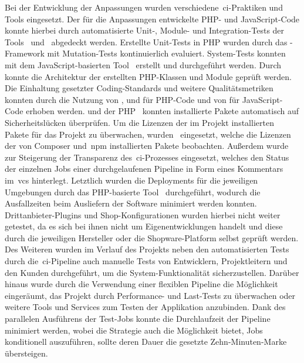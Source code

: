 Bei der Entwicklung der Anpassungen wurden verschiedene\ \acrshort{ci}-Praktiken und Tools eingesetzt.
Der für die Anpassungen entwickelte PHP- und JavaScript-Code konnte hierbei durch automatisierte Unit-, Module- und
Integration-Tests der Tools\  und\  abgedeckt werden.
Erstellte Unit-Tests in PHP wurden durch das -Framework mit Mutation-Tests kontinuierlich
evaluiert.
System-Tests konnten mit dem JavaScript-basierten Tool\  erstellt und durchgeführt werden.
Durch\  konnte die Architektur der erstellten PHP-Klassen und Module geprüft werden.
Die Einhaltung gesetzter Coding-Standards und weitere Qualitätsmetriken konnten durch die Nutzung von
,  und  für PHP-Code und von  für
JavaScript-Code erhoben werden.
 und der PHP\  konnten installierte Pakete automatisch auf
Sicherheitslücken überprüfen.
Um die Lizenzen der im Projekt installierten Pakete für das Projekt zu überwachen, wurden\ 
eingesetzt, welche die Lizenzen der von Composer und\ \acrshort{npm} installierten Pakete beobachten.
Außerdem wurde\  zur Steigerung der Transparenz des\ \acrshort{ci}-Prozesses eingesetzt, welches
den Status der einzelnen Jobs einer durchgelaufenen Pipeline in Form eines Kommentars im\ \acrshort{vcs} hinterlegt.
Letztlich wurden die Deployments für die jeweiligen Umgebungen durch das PHP-basierte Tool\ 
durchgeführt, wodurch die Ausfallzeiten beim Ausliefern der Software minimiert werden konnten.
\\
Drittanbieter-Plugins und Shop-Konfigurationen wurden hierbei nicht weiter getestet, da es sich bei ihnen nicht um
Eigenentwicklungen handelt und diese durch die jeweiligen Hersteller oder die Shopware-Platform selbst geprüft werden.
Des Weiteren wurden im Verlauf des Projekts neben den automatisierten Tests durch die\ \acrshort{ci}-Pipeline auch
manuelle Tests von Entwicklern, Projektleitern und den Kunden durchgeführt, um die System-Funktionalität
sicherzustellen.
Darüber hinaus wurde durch die Verwendung einer flexiblen Pipeline die Möglichkeit eingeräumt, das Projekt durch
Performance- und Last-Tests zu überwachen oder weitere Tools und Services zum Testen der Applikation anzubinden.
Dank des parallelen Ausführens der Test-Jobs konnte die Durchlaufzeit der Pipeline minimiert werden, wobei die
Strategie auch die Möglichkeit bietet, Jobs konditionell auszuführen, sollte deren Dauer die gesetzte Zehn-Minuten-Marke
übersteigen.

\clearpage
